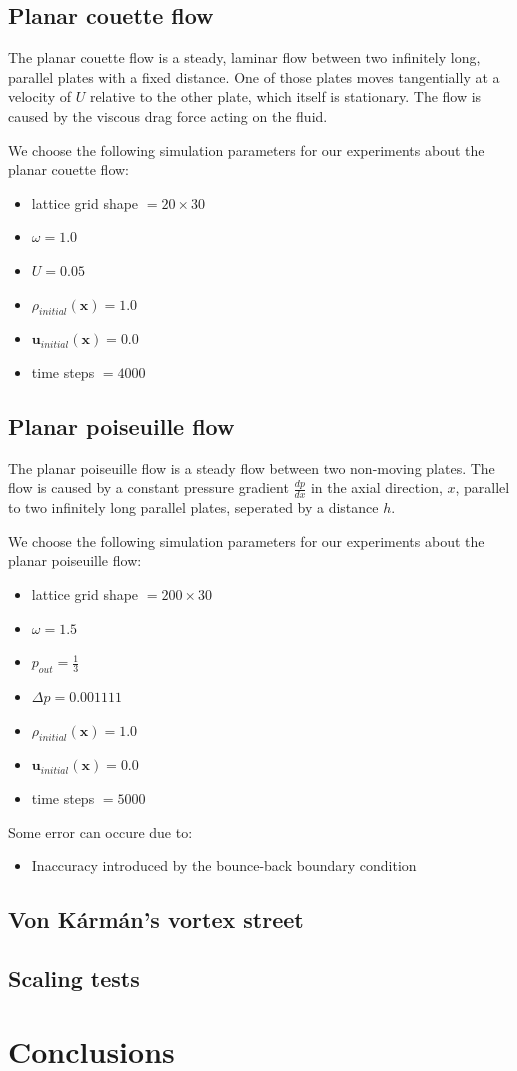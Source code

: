 \documentclass[a4paper,11pt, footsepline]{book}
\begin{document}
\section{Planar couette flow}
The planar couette flow is a steady, laminar flow between two infinitely long, parallel plates with a fixed distance. One of those plates moves tangentially at a velocity of $U$ relative to the other plate, which itself is stationary. The flow is caused by the viscous drag force acting on the fluid.

We choose the following simulation parameters for our experiments about the planar couette flow:
\begin{itemize}
\setlength\itemsep{0.15em}
\item lattice grid shape $=20\times 30$
\item $\omega=1.0$
\item $U=0.05$
\item $\rho_{initial}(\mathbf{x})=1.0$
\item $\mathbf{u}_{initial}(\mathbf{x})=0.0$
\item time steps $=4000$
\end{itemize}
\section{Planar poiseuille flow}
The planar poiseuille flow is a steady flow between two non-moving plates. The flow is caused by a constant pressure gradient $\frac{dp}{dx}$ in the axial direction, $x$, parallel to two infinitely long parallel plates, seperated by a distance $h$.

We choose the following simulation parameters for our experiments about the planar poiseuille flow:
\begin{itemize}
\setlength\itemsep{0.15em}
\item lattice grid shape $=200\times 30$
\item $\omega=1.5$
\item $p_{out}=\frac{1}{3}$
\item $\Delta p=0.001111$
\item $\rho_{initial}(\mathbf{x})=1.0$
\item $\mathbf{u}_{initial}(\mathbf{x})=0.0$
\item time steps $=5000$
\end{itemize}

Some error can occure due to:
\begin{itemize}
\item Inaccuracy introduced by the bounce-back boundary condition
\end{itemize}
\section{Von K\'{a}rm\'{a}n's vortex street}
\section{Scaling tests}
\chapter{Conclusions}\label{ch-conclusion}


\newpage



\end{document}
